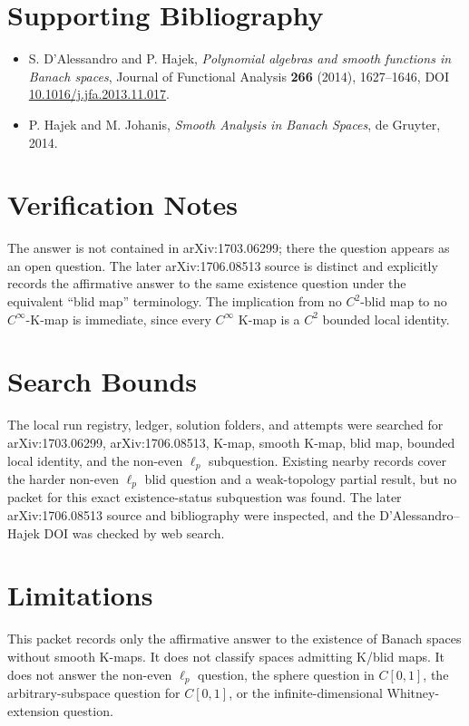 \documentclass[11pt]{article}
\begin{document}
\section*{Supporting Bibliography}

\begin{itemize}
\item S. D'Alessandro and P. Hajek,
\emph{Polynomial algebras and smooth functions in Banach spaces},
Journal of Functional Analysis \textbf{266} (2014), 1627--1646,
DOI \href{https://doi.org/10.1016/j.jfa.2013.11.017}{10.1016/j.jfa.2013.11.017}.
\item P. Hajek and M. Johanis,
\emph{Smooth Analysis in Banach Spaces},
de Gruyter, 2014.
\end{itemize}

\section*{Verification Notes}

The answer is not contained in arXiv:1703.06299; there the question appears
as an open question.  The later arXiv:1706.08513 source is distinct and
explicitly records the affirmative answer to the same existence question
under the equivalent ``blid map'' terminology.  The implication from no
\(C^2\)-blid map to no \(C^\infty\)-K-map is immediate, since every
\(C^\infty\) K-map is a \(C^2\) bounded local identity.

\section*{Search Bounds}

The local run registry, ledger, solution folders, and attempts were searched
for arXiv:1703.06299, arXiv:1706.08513, K-map, smooth K-map, blid map,
bounded local identity, and the non-even \(\ell_p\) subquestion.  Existing
nearby records cover the harder non-even \(\ell_p\) blid question and a
weak-topology partial result, but no packet for this exact existence-status
subquestion was found.  The later arXiv:1706.08513 source and bibliography
were inspected, and the D'Alessandro--Hajek DOI was checked by web search.

\section*{Limitations}

This packet records only the affirmative answer to the existence of Banach
spaces without smooth K-maps.  It does not classify spaces admitting K/blid
maps.  It does not answer the non-even \(\ell_p\) question, the sphere
question in \(C[0,1]\), the arbitrary-subspace question for \(C[0,1]\), or
the infinite-dimensional Whitney-extension question.
\end{document}
